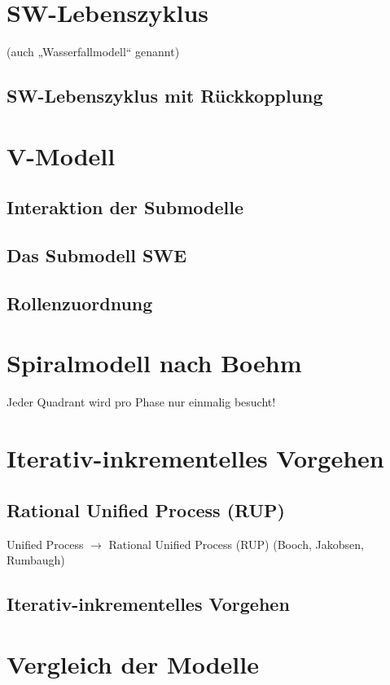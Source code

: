 \documentclass{scrreprt}
\begin{document}
\section{SW-Lebenszyklus}
(auch „Wasserfallmodell“ genannt)
\subsection{SW-Lebenszyklus mit Rückkopplung}

\section{V-Modell}
\subsection{Interaktion der Submodelle}
\subsection{Das Submodell SWE}
\subsection{Rollenzuordnung}

\section{Spiralmodell nach Boehm}
Jeder Quadrant wird pro Phase nur einmalig besucht!

\section{Iterativ-inkrementelles Vorgehen}

\subsection{Rational Unified Process (RUP)}
Unified Process $\to$ Rational Unified Process (RUP) (Booch, Jakobsen, Rumbaugh)

\subsection{Iterativ-inkrementelles Vorgehen}

\section{Vergleich der Modelle}
\end{document}
